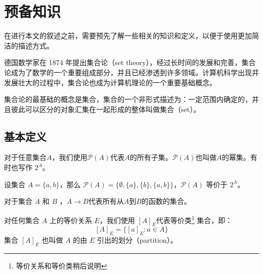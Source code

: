 \chapter{预备知识}

在进行本文的叙述之前，需要预先了解一些相关的知识和定义，以便于使用更加简洁的描述方式。

德国数学家在 1874 年提出集合论（set theory），经过长时间的发展和完善，集合论成为了数学的一个重要组成部分，并且已经渗透到许多领域。计算机科学出现并发展壮大的过程中，集合论也成为计算机理论的一个重要基础概念。

集合论的最基础的概念是集合，集合的一个非形式描述为：一定范围内确定的，并且彼此可以区分的对象汇集在一起形成的整体叫做集合（set）\cite{book1}。



\section{基本定义}

\begin{definition} \label{pro:mathP}
    对于任意集合$A$，我们使用$\mathcal{P}(A)$代表$A$的所有子集。$\mathcal{P}(A)$也叫做$A$的幂集。有时也写作 $2^A$。
\end{definition}

\begin{example}[集合的幂集]
    设集合 $A=\{a,b\}$，那么 $ \mathcal{P}(A) = \{\emptyset,\{a\},\{b\},\{a,b\} \} $，$\mathcal{P}(A)$ 等价于 $2^A$。
\end{example}

\begin{definition}
    对于集合 $A$ 和 $B$ ，$A\to B$代表所有从$A$到$B$的函数的集合。
\end{definition}


\begin{definition}
    对任何集合 $A$ 上的等价关系 $E$，我们使用 $[A]_E$代表等价类\footnote{等价关系和等价类稍后说明} 集合，即：
$$ [A]_E = \{ [a]_E :a \in A \} $$
集合 $[A]_E$ 也叫做 $A$ 的由 $E$ 引出的划分（partition）。
\end{definition}

